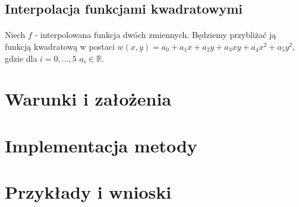 \documentclass{article}
\begin{document}
\subsection{Interpolacja funkcjami kwadratowymi}
\paragraph{}
Niech $f$ - interpolowana funkcja dwóch zmiennych. Będziemy przybliżać ją funkcją kwadratową w postaci $w(x,y) = a_0 + a_1x + a_2y + a_3xy + a_4x^2 + a_5y^2$, gdzie dla $i=0,\dots,5$  $a_i \in \mathbb{R}$.
\paragraph{}

\section{Warunki i założenia}
\section{Implementacja metody}
\section{Przykłady i wnioski}
\end{document}
